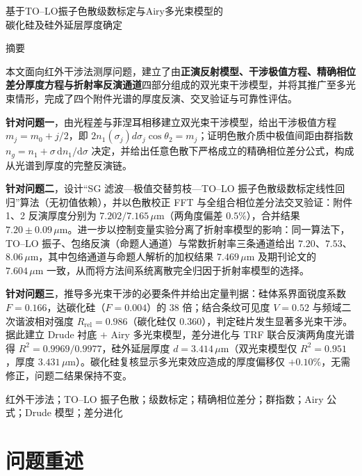 \documentclass[11pt,a4paper,fontset=fandol]{ctexart}
\newcommand{\um}{\,\mu\mathrm{m}}
\begin{document}
\begin{center}
    {\heiti 基于TO--LO振子色散级数标定与Airy多光束模型的\\[0.2em]碳化硅及硅外延层厚度确定}
\end{center}

\begin{center}
    {\heiti 摘\quad 要}
\end{center}

本文面向红外干涉法测厚问题，建立了由\textbf{正演反射模型、干涉极值方程、精确相位差分厚度方程与折射率反演通道}四部分组成的双光束干涉模型，并将其推广至多光束情形，完成了四个附件光谱的厚度反演、交叉验证与可靠性评估。

\textbf{针对问题一}，由光程差与菲涅耳相移建立双光束干涉模型，给出干涉极值方程 $m_j=m_0+j/2$，即 $2n_1(\sigma_j)d\sigma_j\cos\theta_2=m_j$；证明色散介质中极值间距由群指数 $n_g=n_1+\sigma\,\mathrm{d}n_1/\mathrm{d}\sigma$ 决定，并给出任意色散下严格成立的精确相位差分公式，构成从光谱到厚度的完整反演链。

\textbf{针对问题二}，设计``SG 滤波---极值交替剪枝---TO--LO 振子色散级数标定线性回归''算法（无初值依赖），并以色散校正 FFT 与全组合相位差分法交叉验证：附件 1、2 反演厚度分别为 $7.202/7.165\um$（两角度偏差 $0.5\%$），合并结果 $7.20\pm0.09\um$。进一步以控制变量实验分离了折射率模型的影响：同一算法下，TO--LO 振子、包络反演（命题人通道）与常数折射率三条通道给出 $7.20$、$7.53$、$8.06\um$，其中包络通道与命题人解析\cite{xue2026}的加权结果 $7.469\um$ 及期刊论文\cite{zhu2026}的 $7.604\um$ 一致，从而将方法间系统离散完全归因于折射率模型的选择。

\textbf{针对问题三}，推导多光束干涉的必要条件并给出定量判据：硅体系界面锐度系数 $F=0.166$，达碳化硅（$F=0.004$）的 $38$ 倍；结合条纹可见度 $V=0.52$ 与频域二次谐波相对强度 $R_{\mathrm{rel}}=0.986$（碳化硅仅 $0.360$），判定硅片发生显著多光束干涉。据此建立 Drude 衬底 $+$ Airy 多光束模型，差分进化与 TRF 联合反演两角度光谱得 $R^2=0.9969/0.9977$，硅外延层厚度 $d=3.414\um$（双光束模型仅 $R^2=0.951$，厚度 $3.431\um$）。碳化硅复核显示多光束效应造成的厚度偏移仅 $+0.10\%$，无需修正，问题二结果保持不变。

\vspace{0.6em}
红外干涉法；TO--LO 振子色散；级数标定；精确相位差分；群指数；Airy 公式；Drude 模型；\mbox{差分进化}

\newpage

\section{问题重述}
\end{document}
